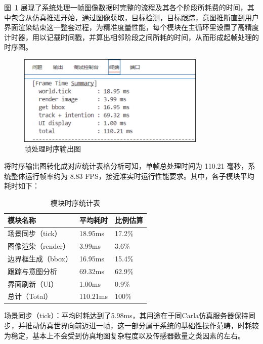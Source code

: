 图~\ref{fig:frame} 展现了系统处理一帧图像数据时完整的流程及其各个阶段所耗费的时间，其中包含从仿真推进开始，通过图像获取，目标检测，目标跟踪，意图推断直到用户界面渲染结束这一整套过程，为精准度量性能，每个模块在主循环里设置了高精度计时器，用以记载时间戳，并算出相邻阶段之间所耗的时间，从而形成起帧处理的时序图。

\begin{figure}[H]
    \centering
    \includegraphics[width=0.8\textwidth]{images/图11 帧处理时序输出图.pdf}  %
    \caption{帧处理时序输出图}
    \label{fig:frame}  %
\end{figure}

将时序输出图转化成对应统计表格分析可知，单帧总处理时间为 110.21 毫秒，系统整体运行帧率约为 8.83 FPS，接近准实时运行性能要求。其中，各子模块平均耗时如下：

\begin{table}[htbp]
  \caption{模块时序统计表}
  \label{tab:timetable}
  \centering
  \begin{tabular}{lll}
    \toprule
    模块名称 & 平均耗时 & 比例估算 \\
    \midrule
    场景同步（tick） & 18.95ms & 17.2\% \\
    图像渲染（render） & 3.99ms & 3.6\% \\
    边界框生成（bbox） & 16.95ms & 15.4\% \\
    跟踪与意图分析 & 69.32ms & 62.9\% \\
    界面刷新（UI） & 1.00ms & 0.9\% \\
	总计（Total） & 110.21ms & 100\% \\
    \bottomrule
  \end{tabular}
\end{table}

场景同步（tick）：平均时耗达到了5.98ms，其用途在于同Carla仿真服务器保持同步，并推动仿真世界向前迈进一帧，这一部分属于系统的基础性操作范畴，时耗较为稳定，基本上不会受到仿真地图复杂程度以及传感器数量之类因素的左右。

